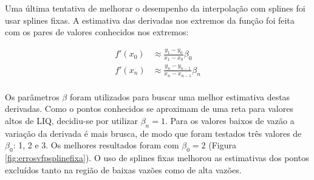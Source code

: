\documentclass[final,5p]{elsarticle}
\numberwithin{equation}{section}
\begin{document}
        Uma última tentativa de melhorar o desempenho da interpolação com splines foi usar splines fixas. A estimativa das derivadas nos extremos da função foi feita com os pares de valores conhecidos nos extremos:

        \begin{align*}
            f'(x_0) &\approx \frac{y_1-y_0}{x_1-x_0} \beta_0 \\
            f'(x_n) &\approx \frac{y_n-y_{n-1}}{x_n-x_{n-1}} \beta_n \\
        \end{align*}

        Os parâmetros $\beta$ foram utilizados para buscar uma melhor estimativa destas derivadas. Como o pontos conhecidos se aproximam de uma reta para valores altos de LIQ, decidiu-se por utilizar $\beta_n=1$. Para os valores baixos de vazão a variação da derivada é mais brusca, de modo que foram testados três valores de $\beta_0$: 1, 2 e 3. Os melhores resultados foram com $\beta_0=2$ (Figura \ref{fig:errosvfpsplinefixa}). O uso de splines fixas melhorou as estimativas dos pontos excluídos tanto na região de baixas vazões como de alta vazões.
\end{document}
